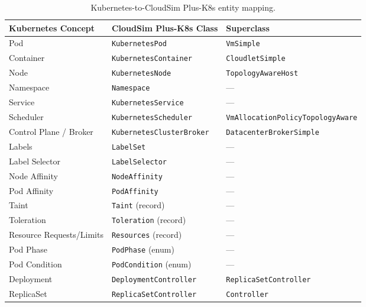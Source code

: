 \documentclass[ASNA,twocolumn]{USG}
\newcommand{\ckm}{CloudSim Plus-K8s\xspace}
\begin{document}
    \begin{table}[tp]
        \centering
        \caption{Kubernetes-to-\ckm entity mapping.\label{tab:mapping}}
        \small
        \setlength{\extrarowheight}{0pt}%
        \renewcommand{\arraystretch}{0.86}%
        \begin{tabular*}{\textwidth}{@{\extracolsep{\fill}}lll@{}}
\toprule
\textbf{Kubernetes Concept} & \textbf{\ckm Class} & \textbf{Superclass} \\
\midrule
Pod                    & \texttt{KubernetesPod}              & \texttt{VmSimple} \\
Container              & \texttt{KubernetesContainer}        & \texttt{CloudletSimple} \\
Node                   & \texttt{KubernetesNode}             & \texttt{TopologyAwareHost} \\
Namespace              & \texttt{Namespace}                  & --- \\
Service                & \texttt{KubernetesService}          & --- \\
Scheduler              & \texttt{KubernetesScheduler}        & \texttt{VmAllocationPolicyTopologyAware} \\
Control Plane / Broker & \texttt{KubernetesClusterBroker}    & \texttt{DatacenterBrokerSimple} \\
Labels                 & \texttt{LabelSet}                   & --- \\
Label Selector         & \texttt{LabelSelector}              & --- \\
Node Affinity          & \texttt{NodeAffinity}               & --- \\
Pod Affinity           & \texttt{PodAffinity}                & --- \\
Taint                  & \texttt{Taint} (record)             & --- \\
Toleration             & \texttt{Toleration} (record)        & --- \\
Resource Requests/Limits & \texttt{Resources} (record)       & --- \\
Pod Phase              & \texttt{PodPhase} (enum)            & --- \\
Pod Condition          & \texttt{PodCondition} (enum)        & --- \\
Deployment             & \texttt{DeploymentController}       & \texttt{ReplicaSetController} \\
ReplicaSet             & \texttt{ReplicaSetController}       & \texttt{Controller} \\

\end{tabular*}
\end{table}
\end{document}
